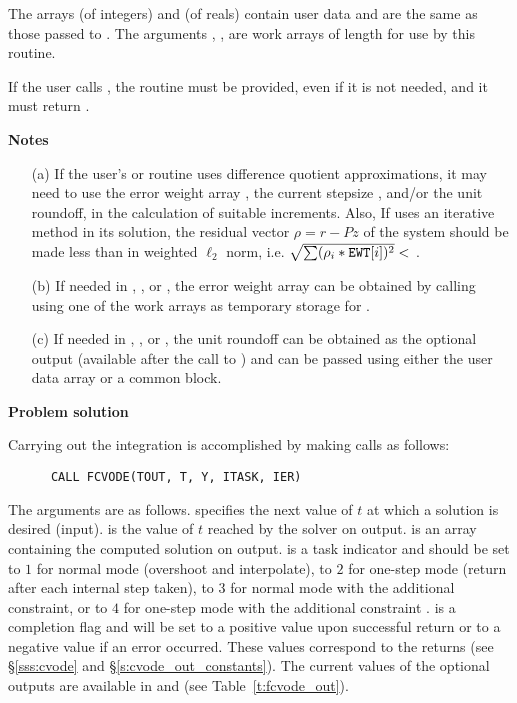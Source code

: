 \begin{Steps}
  The arrays  (of integers) and  (of reals) contain user data
  and are the same as those passed to .
  The arguments , ,  are work arrays of length 
   for use by this routine.

  {\warn}If the user calls , the routine  must
  be provided, even if it is not needed, and it must return .

  {\bf Notes} 
  \begin{itemize}
  \item[(a) ] If the user's  or  routine uses difference
    quotient approximations, it may need to use the error weight array ,
    the current stepsize , and/or the unit roundoff, in the calculation of
    suitable increments.  Also, If  uses an iterative method in its
    solution, the residual vector $\rho = r - Pz$ of the system should be made
    less than  in weighted $\ell_2$ norm, i.e.
    $\sqrt{\sum(\rho_i * {\tt EWT}[i])^2} < $ .
  \item[(b) ] If needed in , , or , the
    error weight array  can be obtained by calling 
    using one of the work arrays as temporary storage for .
  \item[(c) ] If needed in , , or , the
    unit roundoff can be obtained as the optional output 
    (available after the call to ) and can be passed
    using either the  user data array or a common block.
  \end{itemize}

\item {\bf Problem solution}

  Carrying out the integration is accomplished by making calls as follows:
\begin{verbatim}
      CALL FCVODE(TOUT, T, Y, ITASK, IER)
\end{verbatim}
  The arguments are as follows.
   specifies the next value of $t$ at which a solution is desired (input).
   is the value of $t$ reached by the solver on output.
   is an array containing the computed solution on output.
   is a task indicator and should be set to $1$ for normal mode 
  (overshoot  and interpolate), to $2$ for one-step mode 
  (return after each internal step taken), to $3$ for normal mode with
  the additional  constraint, or to $4$ for one-step mode 
  with the additional constraint .
   is a completion flag and will be set to a positive value upon
  successful return or to a negative value if an error occurred. These values
  correspond to the  returns (see \S\ref{sss:cvode} and \S\ref{s:cvode_out_constants}).
  The current values of the optional outputs are available in  and
   (see Table~\ref{t:fcvode_out}).
  

\end{Steps}
